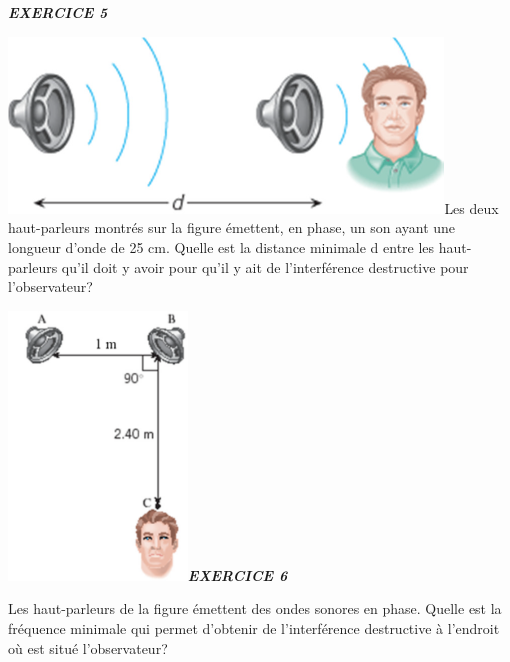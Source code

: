 \emph{\textbf{EXERCICE 5}}

\includegraphics[width=11.546cm,height=4.688cm]{Pictures/1000000100000363000001603D3E7105AB252F90.png}Les
deux haut-parleurs montrés sur la figure émettent, en phase, un son
ayant une longueur d'onde de 25 cm. Quelle est la distance minimale d
entre les haut-parleurs qu'il doit y avoir pour qu'il y ait de
l'interférence destructive pour l'observateur?

\includegraphics[width=4.757cm,height=7.147cm]{Pictures/10000001000001BA00000298E2F6E319C348E061.png}\emph{\textbf{EXERCICE
6}}

Les haut-parleurs de la figure émettent des ondes sonores en phase.
Quelle est la fréquence minimale qui permet d'obtenir de l'interférence
destructive à l'endroit où est situé l'observateur?

